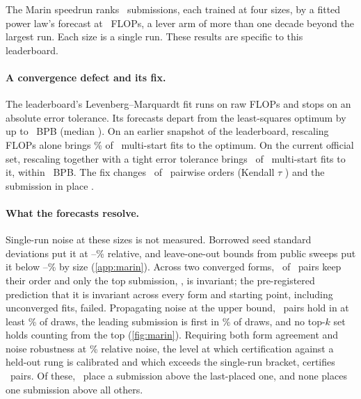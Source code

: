\documentclass{article}
\begin{document}
The Marin speedrun \citep{marin2025speedrun} ranks \marinSubmissions\
submissions, each trained at four sizes, by a fitted power law's forecast at  %
\marinForecastX\ FLOPs, a lever arm of more than one decade beyond the largest
run. Each size is a single run. These results are specific to this leaderboard.

\paragraph{A convergence defect and its fix.} The leaderboard's
Levenberg--Marquardt fit runs on raw FLOPs and stops on an absolute error
tolerance. Its forecasts depart from the least-squares optimum by up to
\marinDepartMax\ BPB (median \marinDepartMedian). On an earlier snapshot of the
leaderboard, rescaling FLOPs alone brings \marinScaledOnlyShare\% of
\marinScaledOnlyFits\ multi-start fits to the optimum. On the current official
set, rescaling together with a tight error tolerance brings
\marinMultistartReached\ of \marinMultistartFits\ multi-start fits to it, within
\marinMultistartDepart\ BPB. The fix changes
\marinPairsChanged\ of \marinPairs\ pairwise orders (Kendall $\tau$
\marinKendall) and the submission in place \marinChangedPlace.

\paragraph{What the forecasts resolve.} Single-run noise at these sizes is not
measured. Borrowed seed standard deviations put it at
\noiseLowMin--\noiseLowMax\% relative, and leave-one-out bounds from public
sweeps put it below \marinBoundLow--\marinBoundHigh\% by size
(\cref{app:marin}). Across two converged forms, \marinFormCore\ of \marinPairs\
pairs keep their order and only the top submission, \marinFormTopOne, is
invariant; the pre-registered prediction that it is invariant across every
form and starting point, including unconverged fits, failed. Propagating noise at the upper bound, \marinHold\ pairs hold in at
least \marinHoldLevel\% of draws, the leading submission is first in
\marinTopOneShare\% of draws, and no top-$k$ set holds counting from the top
(\cref{fig:marin}). Requiring both form agreement and noise robustness at
\marinSigmaStar\% relative noise, the level at which certification against a
held-out rung is calibrated and which exceeds the single-run bracket,
certifies \marinCertified\ pairs. Of these, \marinCertifiedVsLast\ place a
submission above the last-placed one, and none places one submission above all
others.
\end{document}

